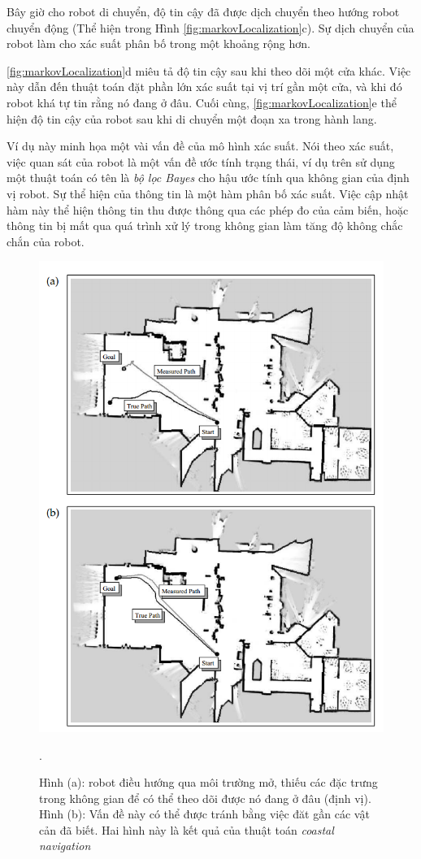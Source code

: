 Bây giờ cho robot di chuyển, độ tin cậy đã được dịch chuyển theo hướng robot chuyển động (Thể hiện trong Hình \ref{fig:markovLocalization}c).
Sự dịch chuyển của robot làm cho xác suất phân bố trong một khoảng rộng hơn.
\figurename{ \ref{fig:markovLocalization}d miêu tả độ tin cậy sau khi theo dõi một cửa khác.
Việc này dẫn đến thuật toán đặt phần lớn xác suất tại vị trí gần một cửa, và khi đó robot khá tự tin rằng nó đang ở đâu. Cuối cùng, \figurename{ \ref{fig:markovLocalization}}e thể hiện độ tin cậy của robot sau khi di chuyển một đoạn xa trong hành lang.

Ví dụ này minh họa một vài vấn đề của mô hình xác suất. Nói theo xác suất, việc quan sát của robot là một vấn đề ước tính trạng thái, ví dụ trên sử dụng một thuật toán có tên là \textit{bộ lọc Bayes} cho hậu ước tính qua không gian của định vị robot. Sự thể hiện của thông tin là một hàm phân bố xác suất. Việc cập nhật hàm này thể hiện thông tin thu được thông qua các phép đo của cảm biến, hoặc thông tin bị mất qua quá trình xử lý trong không gian làm tăng độ không chắc chắn của robot.

\begin{figure}[htbp]
  \centering
  \includegraphics[width=0.8\linewidth]{figures/coastal-Navigation.png}
  \caption[Coastal navigation]{Hình (a): robot điều hướng qua môi trường mở, thiếu các đặc trưng trong không gian để có thể theo dõi được nó đang ở đâu (định vị). Hình (b): Vấn đề này có thể được tránh bằng việc đăt gần các vật cản đã biết. Hai hình này là kết quả của thuật toán \textit{coastal navigation} \cite{thrun2005probabilistic}}.
  \label{fig:coastalNavigation}
\end{figure}

}

